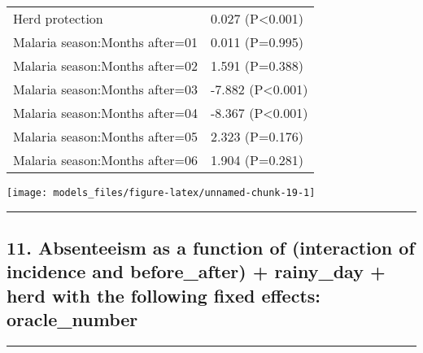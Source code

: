 \documentclass[]{article}
\begin{document}
\begin{longtable}[t]{ll}
\hspace{1em}Herd protection & 0.027 (P<0.001)\\
\hspace{1em}Malaria season:Months after=01 & 0.011 (P=0.995)\\
\hspace{1em}Malaria season:Months after=02 & 1.591 (P=0.388)\\
\hspace{1em}Malaria season:Months after=03 & -7.882 (P<0.001)\\
\hspace{1em}Malaria season:Months after=04 & -8.367 (P<0.001)\\
\hspace{1em}Malaria season:Months after=05 & 2.323 (P=0.176)\\
\hspace{1em}Malaria season:Months after=06 & 1.904 (P=0.281)\\*
\end{longtable}

\begin{center}\texttt{[image: models\_files/figure-latex/unnamed-chunk-19-1]} \end{center}

\newpage

\begin{center}\rule{0.5\linewidth}{\linethickness}\end{center}

\subsection{11. Absenteeism as a function of (interaction of incidence
and before\_after) + rainy\_day + herd with the following fixed effects:
oracle\_number}\label{absenteeism-as-a-function-of-interaction-of-incidence-and-before_after-rainy_day-herd-with-the-following-fixed-effects-oracle_number}

\begin{center}\rule{0.5\linewidth}{\linethickness}\end{center}
\end{document}
